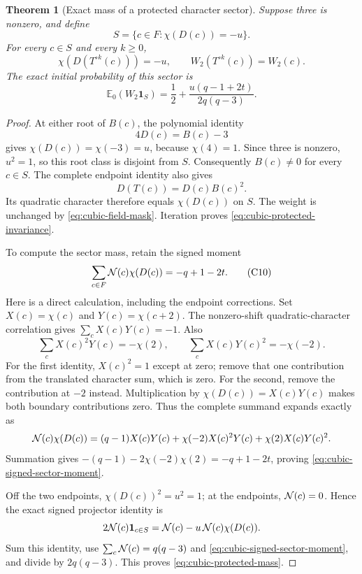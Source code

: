 \documentclass[11pt]{article}
\newtheorem{theorem}{Theorem}[section]
\begin{document}
\begin{theorem}[Exact mass of a protected character sector]
\label{thm:cubic-protected-sector}
Suppose three is nonzero, and define
\[
 S=\{c\in F:\chi(D(c))=-u\}.
\]
For every \(c\in S\) and every \(k\ge0\),
\[
 \chi(D(T^{\circ k}(c)))=-u,\qquad
 W_2(T^{\circ k}(c))=W_2(c).
 \tag{C8}\label{eq:cubic-protected-invariance}
\]
The exact initial probability of this sector is
\[
 \boxed{\mathbb E_0(W_2\mathbf1_S)
 =\frac12+\frac{u(q-1+2t)}{2q(q-3)}.}
 \tag{C9}\label{eq:cubic-protected-mass}
\]
\end{theorem}
\begin{proof}
At either root of \(B(c)\), the polynomial identity
\[
 4D(c)=B(c)-3
\]
gives \(\chi(D(c))=\chi(-3)=u\), because \(\chi(4)=1\).
Since three is nonzero, \(u^2=1\), so this root class is disjoint
from \(S\). Consequently \(B(c)\ne0\) for every \(c\in S\).
The complete endpoint identity also gives
\[
 D(T(c))=D(c)B(c)^2.
\]
Its quadratic character therefore equals \(\chi(D(c))\) on \(S\).
The weight is unchanged by \eqref{eq:cubic-field-mask}.
Iteration proves \eqref{eq:cubic-protected-invariance}.

To compute the sector mass, retain the signed moment
\[
 \sum_{c\in F}{\cal N}(c)\chi(D(c))=-q+1-2t.
 \tag{C10}\label{eq:cubic-signed-sector-moment}
\]
Here is a direct calculation, including the endpoint corrections.
Set \(X(c)=\chi(c)\) and \(Y(c)=\chi(c+2)\).
The nonzero-shift quadratic-character correlation gives
\(\sum_cX(c)Y(c)=-1\). Also
\[
 \sum_c X(c)^2Y(c)=-\chi(2),\qquad
 \sum_c X(c)Y(c)^2=-\chi(-2).
\]
For the first identity, \(X(c)^2=1\) except at zero; remove that
one contribution from the translated character sum, which is zero.
For the second, remove the contribution at \(-2\) instead.
Multiplication by \(\chi(D(c))=X(c)Y(c)\) makes both boundary
contributions zero. Thus the complete summand expands exactly as
\[
 {\cal N}(c)\chi(D(c))
 =(q-1)X(c)Y(c)+\chi(-2)X(c)^2Y(c)
                  +\chi(2)X(c)Y(c)^2.
\]
Summation gives
\(-(q-1)-2\chi(-2)\chi(2)=-q+1-2t\), proving
\eqref{eq:cubic-signed-sector-moment}.

Off the two endpoints, \(\chi(D(c))^2=u^2=1\); at the endpoints,
\({\cal N}(c)=0\). Hence the exact signed projector identity is
\[
 2{\cal N}(c)\mathbf1_{c\in S}
 ={\cal N}(c)-u\,{\cal N}(c)\chi(D(c)).
\]
Sum this identity, use \(\sum_c{\cal N}(c)=q(q-3)\) and
\eqref{eq:cubic-signed-sector-moment}, and divide by \(2q(q-3)\).
This proves \eqref{eq:cubic-protected-mass}.
\end{proof}
\end{document}
